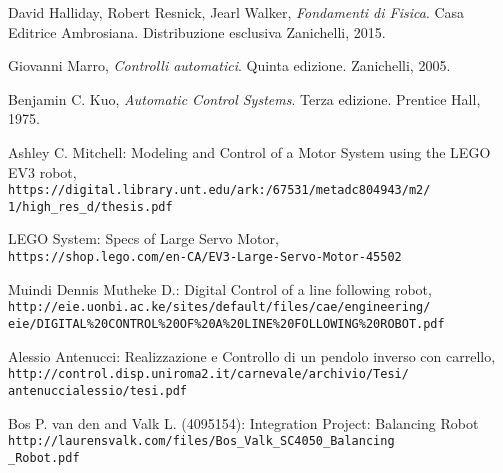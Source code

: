 \documentclass[a4paper,11pt,twoside]{book}
\begin{document}
\begin{thebibliography}{9}

	
	David Halliday, Robert Resnick, Jearl Walker, 
	\textit{Fondamenti di Fisica}. 
	Casa Editrice Ambrosiana. Distribuzione esclusiva Zanichelli, 2015.
	
		
	Giovanni Marro, 
	\textit{Controlli automatici}. 
	Quinta edizione. Zanichelli, 2005.
	
	Benjamin C. Kuo, 
	\textit{Automatic Control Systems}. 
	Terza edizione. Prentice Hall, 1975.
	
	Ashley C. Mitchell: Modeling and Control of a Motor System using the LEGO EV3 robot,
	\\\texttt{https://digital.library.unt.edu/ark:/67531/metadc804943/m2/\\1/high\_res\_d/thesis.pdf}
	
	LEGO System: Specs of Large Servo Motor,
	\\\texttt{https://shop.lego.com/en-CA/EV3-Large-Servo-Motor-45502}
	
	Muindi Dennis Mutheke D.: Digital Control of a line following robot,
	\\\texttt{http://eie.uonbi.ac.ke/sites/default/files/cae/engineering/
		\\eie/DIGITAL\%20CONTROL\%20OF\%20A\%20LINE\%20FOLLOWING\%20ROBOT.pdf}
	
	Alessio Antenucci: Realizzazione e Controllo di un pendolo inverso con carrello,
	\\\texttt{http://control.disp.uniroma2.it/carnevale/archivio/Tesi/\\antenuccialessio/tesi.pdf}
	
	Bos P. van den and Valk L. (4095154): Integration Project: Balancing Robot
	\\\texttt{http://laurensvalk.com/files/Bos\_Valk\_SC4050\_Balancing\\\_Robot.pdf}
	
	
	
\end{thebibliography}
\end{document}
